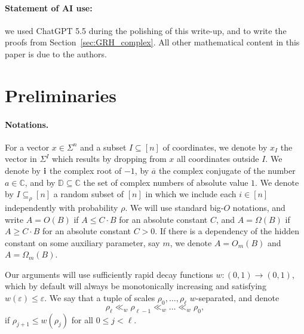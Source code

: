 \documentclass[11pt]{article}
\newcommand\card[1]{\left| {#1} \right|}
\newcommand\eps{\varepsilon}
\renewcommand\geq{\geqslant}
\renewcommand\leq{\leqslant}
\begin{document}
\paragraph{Statement of AI use:} we used ChatGPT 5.5 during the polishing of this write-up, and to write the proofs from Section~\ref{sec:GRH_complex}.
All other mathematical content in this paper is due to the authors.
\section{Preliminaries}
\paragraph{Notations.} 
    For a vector $x\in \Sigma^n$ and a subset $I\subseteq [n]$ of coordinates, we denote by
 $x_I$ the vector in $\Sigma^{I}$ which results by dropping from $x$ all coordinates outside $I$. 
We denote by ${\bf i}$ the complex root of $-1$, by $\overline{a}$ the complex conjugate of the number $a\in\mathbb{C}$, and by $\mathbb{D}\subseteq\mathbb{C}$ the set of complex numbers of absolute value $1$.
We denote by $I\subseteq_{\rho}[n]$ a 
random subset of $[n]$ in which we include each $i\in[n]$ independently with probability $\rho$. We will use standard big-$O$ notations, and write $A = O(B)$ if $A\leq C\cdot B$ for an absolute constant $C$, and $A = \Omega(B)$ if $A\geq C\cdot B$ for an absolute constant $C>0$. If
there is a dependency of the hidden constant on some auxiliary parameter, say $m$, we denote $A = O_m(B)$
and $A = \Omega_m(B)$.

Our arguments will use sufficiently rapid decay functions $w\colon (0,1)\to(0,1)$, which by default will always be monotonically increasing and satisfying $w(\eps)\leq \eps$. 
We say that a tuple of scales 
$\rho_0,\ldots,\rho_{\ell}$ $w$-separated, and denote
\[
\rho_\ell\ll_w\rho_{\ell-1}\ll_w\ldots\ll_w\rho_0,
\]
if $\rho_{j+1}\leq w(\rho_j)$ for all $0\leq j<\ell$.
\end{document}
